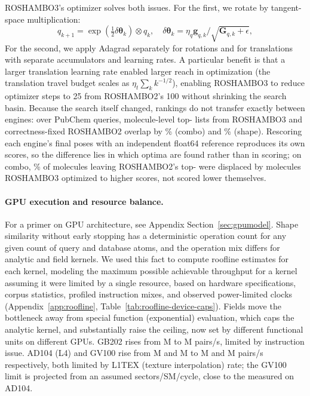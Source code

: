 \documentclass{article}
\newcommand{\vect}[1]{\bm{#1}}
\begin{document}
ROSHAMBO3's optimizer solves both issues. For the first,
we rotate by tangent-space multiplication:
\begin{equation}
 q_{k+1}=\exp(\tfrac12\delta\vect\theta_k)\otimes q_k,
 \quad \delta\vect\theta_k=\eta_q\vect g_{q,k}/
 \sqrt{\vect G_{q,k}+\epsilon},
 \label{eq:expmap}
\end{equation}
For the second, we apply Adagrad separately
for rotations and for translations with separate accumulators and learning rates.
A particular benefit is that a larger translation learning rate
enabled larger reach in optimization (the translation travel budget scales as $\eta_t\sum_k k^{-1/2}$),
enabling ROSHAMBO3 to reduce optimizer steps to 25 from ROSHAMBO2's 100 without shrinking the search basin.
Because the search itself changed, rankings do not transfer exactly between engines: over \OptSensQueries{} PubChem queries, molecule-level top-\OptSensTopK{} lists from ROSHAMBO3 and correctness-fixed ROSHAMBO2 overlap by \OptSensComboTopKOverlapPct\% (combo) and \OptSensShapeTopKOverlapPct\% (shape).
Rescoring each engine's final poses with an independent float64 reference reproduces its own scores, so the difference lies in which optima are found rather than in scoring; on combo, \OptSensComboDisplacedPct\% of molecules leaving ROSHAMBO2's top-\OptSensTopK{} were displaced by molecules ROSHAMBO3 optimized to higher scores, not scored lower themselves.


\paragraph{GPU execution and resource balance.}
For a primer on GPU architecture, see Appendix Section~\ref{sec:gpumodel}.
Shape similarity without early stopping has a deterministic operation count for any given count of query and database atoms, and the operation mix differs for analytic and field kernels. We used this fact to compute roofline estimates for each kernel, modeling the maximum possible achievable throughput for a kernel assuming it were limited by a single resource, based on hardware specifications,
corpus statistics, profiled instruction mixes, and observed power-limited clocks
(Appendix~\ref{app:roofline}, Table~\ref{tab:roofline-device-caps}). Fields move the bottleneck away from special function (exponential) evaluation, which caps the analytic kernel, and substantially raise the ceiling, now set by different functional units on different GPUs.
GB202 rises from \RooflineBlackwellAnalyticStructuralMillionPairsPerSecond{}M to \RooflineBlackwellFieldIssueMillionPairsPerSecond{}M pairs/s, limited by instruction issue.
AD104 (L4) and GV100 rise from \RooflineLFourAnalyticStructuralMillionPairsPerSecond{}M and \RooflineTitanAnalyticStructuralMillionPairsPerSecond{}M to \RooflineLFourFieldLoneTexMillionPairsPerSecond{}M and \RooflineTitanFieldLoneTexMillionPairsPerSecond{}M pairs/s respectively, both limited by L1TEX (texture interpolation) rate; the GV100 limit is projected from an assumed \RooflineTitanLoneTexSectorsPerSmCycle{} sectors/SM/cycle, close to the \RooflineLFourLoneTexSectorsPerSmCycle{} measured on AD104.
\end{document}
